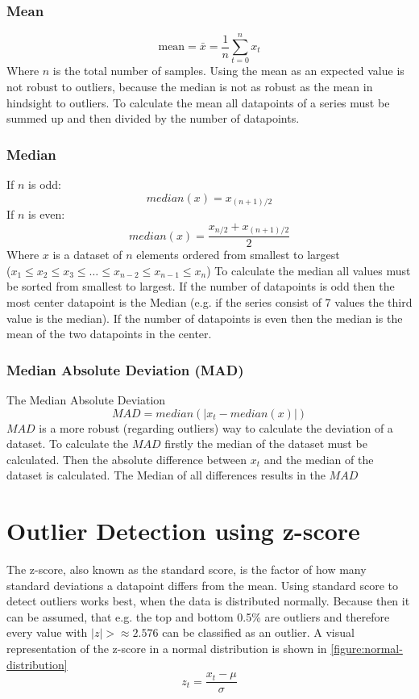 \subsubsection{Mean}
$$
  \text{mean} = \bar{x} = \frac{1}{n} \sum^n_{t=0}x_t
$$
Where $n$ is the total number of samples. Using the mean as an expected value is not robust to outliers, because the median is not as robust as the mean in hindsight to outliers. To calculate the mean all datapoints of a series must be summed up and then divided by the number of datapoints.
\subsubsection{Median}
If $n$ is odd:
$$
  median(x) = x_{(n+1)/2}
$$
If $n$ is even:
$$
  median(x) = \frac{x_{n/2} + x_{(n+1)/2}}{2}
$$
Where $x$ is a dataset of $n$ elements ordered from smallest to largest\\
($x_1 \leq x_2 \leq x_3 \leq \ldots \leq x_{n-2} \leq x_{n-1} \leq x_n$)
\cite{blazquez-garciaReviewOutlierAnomaly2020}
To calculate the median all values must be sorted from smallest to largest. If the number of datapoints is odd then the most center datapoint is the Median (e.g. if the series consist of 7 values the third value is the median). If the number of datapoints is even then the median is the mean of the two datapoints in the center.
\subsubsection{Median Absolute Deviation (\ac{MAD})}
The Median Absolute Deviation 
$$
  MAD = median(|x_t - median(x)|)
$$
$MAD$ is a more robust (regarding outliers) way to calculate the deviation of a dataset. To calculate the $MAD$ firstly the median of the dataset must be calculated. Then the absolute difference between $x_t$ and the median of the dataset is calculated. The Median of all differences results in the $MAD$
\cite{leysDetectingOutliersNot2013, mehrangOutlierDetectionWeight2015}

\section{Outlier Detection using z-score}
\label{section:outlier-detection-z-score}
The z-score, also known as the standard score, is the factor of how many standard deviations a datapoint differs from the mean. Using standard score to detect outliers works best, when the data is distributed normally. Because then it can be assumed, that e.g. the top and bottom 0.5\% are outliers and therefore every value with $|z| > \approx 2.576$ can be classified as an outlier. %
A visual representation of the z-score in a normal distribution is shown in \autoref{figure:normal-distribution}
\begin{equation*}
  z_t = \frac{x_t - \mu}{\sigma}
\end{equation*}

